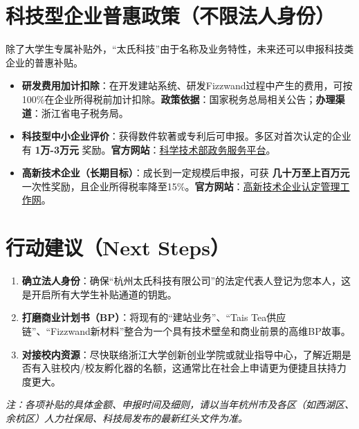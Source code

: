 \documentclass[a4paper, 12pt]{ctexart}
\begin{document}
\section{科技型企业普惠政策（不限法人身份）}
除了大学生专属补贴外，“太氏科技”由于名称及业务特性，未来还可以申报科技类企业的普惠补贴。
\begin{itemize}
    \item \textbf{研发费用加计扣除}：在开发建站系统、研发Fizzwand过程中产生的费用，可按100\%在企业所得税前加计扣除。\textbf{政策依据}：国家税务总局相关公告；\textbf{办理渠道}：浙江省电子税务局。
    \item \textbf{科技型中小企业评价}：获得数件软著或专利后可申报。多区对首次认定的企业有 \textbf{1万-3万元} 奖励。\textbf{官方网站}：\href{https://fuwu.most.gov.cn/}{科学技术部政务服务平台}。
    \item \textbf{高新技术企业（长期目标）}：成长到一定规模后申报，可获 \textbf{几十万至上百万元} 一次性奖励，且企业所得税率降至15\%。\textbf{官方网站}：\href{http://www.innocom.gov.cn/}{高新技术企业认定管理工作网}。
\end{itemize}

\section{行动建议（Next Steps）}
\begin{enumerate}
    \item \textbf{确立法人身份}：确保“杭州太氏科技有限公司”的法定代表人登记为您本人，这是开启所有大学生补贴通道的钥匙。
    \item \textbf{打磨商业计划书（BP）}：将现有的“建站业务”、“Tais Tea供应链”、“Fizzwand新材料”整合为一个具有技术壁垒和商业前景的高维BP故事。
    \item \textbf{对接校内资源}：尽快联络浙江大学创新创业学院或就业指导中心，了解近期是否有入驻校内/校友孵化器的名额，这通常比在社会上申请更为便捷且扶持力度更大。
\end{enumerate}

\vspace{2cm}
\begin{center}
\textit{注：各项补贴的具体金额、申报时间及细则，请以当年杭州市及各区（如西湖区、余杭区）人力社保局、科技局发布的最新红头文件为准。}
\end{center}
\end{document}
